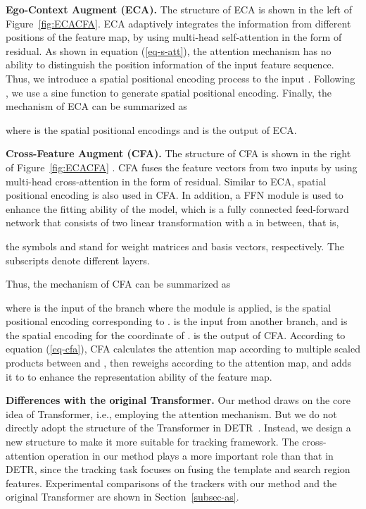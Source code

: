 \documentclass[final]{cvpr}
\begin{document}
{\noindent \textbf{Ego-Context Augment (ECA). }}
The structure of ECA is shown in the left of Figure~\ref{fig:ECACFA}. 
ECA adaptively integrates the information from different positions of the feature map, 
by using multi-head self-attention in the form of residual. 
As shown in equation (\ref{eq-s-att}), the attention mechanism has no ability to distinguish 
the position information of the input feature sequence. 
Thus, we introduce a spatial positional encoding process to the input . 
Following \cite{DETR}, we use a sine function to generate spatial positional encoding. 
Finally, the mechanism of ECA can be summarized as 

where  is the spatial positional encodings and  is the output of ECA.

{\noindent \textbf{Cross-Feature Augment (CFA). }}
The structure of CFA is shown in the right of Figure~\ref{fig:ECACFA} . 
CFA fuses the feature vectors from two inputs by using multi-head cross-attention in the form of residual. 
Similar to ECA, spatial positional encoding is also used in CFA. 
In addition, a FFN module is used to enhance the fitting ability of the model, which is a fully connected 
feed-forward network that consists of two linear transformation with a  in between, that is,

the symbols  and  stand for weight matrices and basis vectors, respectively. 
The subscripts denote different layers.

Thus, the mechanism of CFA can be summarized as 

where  is the input of the branch 
where the module is applied,  is the spatial 
positional encoding corresponding to . 
 is the input from another branch, 
and  is the spatial encoding for the coordinate of . 
 is the output of CFA. 
According to equation (\ref{eq-cfa}), CFA calculates the attention map according to multiple scaled products between  and , then reweighs  according to the attention map, 
and adds it to  to enhance the representation ability of the feature map. 


{\noindent \textbf{Differences with the original Transformer. }}
Our method draws on the core idea of Transformer, i.e., employing the attention mechanism. 
But we do not directly adopt the structure of the Transformer in DETR~\cite{DETR}. 
Instead, we design a new structure to make it more suitable for tracking framework. 
The cross-attention operation in our method plays a more important role than that in DETR, since 
the tracking task focuses on fusing the template and search region features. 
Experimental comparisons of the trackers with our method and the original Transformer 
are shown in Section~\ref{subsec-as}.
\end{document}
